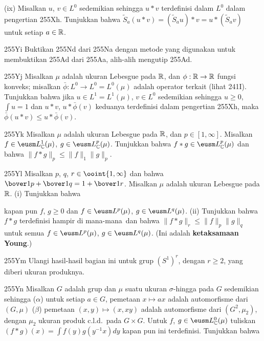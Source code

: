 {\quad (ix) Misalkan $u$, $v\in L^0$ sedemikian sehingga $u*v$ terdefinisi
dalam $L^0$ dalam pengertian 255Xh.   Tunjukkan bahwa
$\tilde S_a(u*v)=(\tilde S_au)*v=u*(\tilde S_av)$ untuk
setiap $a\in\Bbb R$.

\spheader 255Yi Buktikan 255Nd dari 255Na dengan metode yang digunakan untuk
membuktikan 255Ad dari 255Aa, alih-alih mengutip 255Ad.

\spheader 255Yj Misalkan $\mu$ adalah ukuran Lebesgue pada $\Bbb R$, dan
$\phi:\Bbb R\to\Bbb R$ fungsi konveks;  misalkan
$\bar\phi:L^0\to L^0=L^0(\mu)$ adalah operator terkait (lihat 241I).
Tunjukkan bahwa jika $u\in L^1=L^1(\mu)$, $v\in L^0$ sedemikian sehingga $u\ge 0$,
$\int u=1$ dan $u*v$, $u*\bar\phi(v)$ keduanya terdefinisi dalam pengertian
255Xh, maka $\bar\phi(u*v)\le u*\bar\phi(v)$.

\spheader 255Yk Misalkan $\mu$ adalah ukuran Lebesgue pada $\Bbb R$, dan
$p\in[1,\infty]$.   Misalkan $f\in\eusm L^1_{\Bbb C}(\mu)$,
$g\in\eusm L^p_{\Bbb C}(\mu)$.   Tunjukkan bahwa
$f*g\in\eusm L^p_{\Bbb C}(\mu)$ dan bahwa
$\|f*g\|_p\le\|f\|_1\|g\|_p$.   

\spheader 255Yl Misalkan $p$, $q$, $r\in\ooint{1,\infty}$ dan bahwa
$\bover1p+\bover1q=1+\bover1r$.   Misalkan $\mu$ adalah ukuran Lebesgue pada
$\Bbb R$.   (i) Tunjukkan bahwa


\noindent kapan pun $f$, $g\ge 0$ dan $f\in\eusm L^p(\mu)$,
$g\in\eusm L^q(\mu)$.      (ii)
Tunjukkan bahwa $f*g$ terdefinisi hampir di mana-mana\ dan bahwa
$\|f*g\|_r\le\|f\|_p\|g\|_q$ untuk semua $f\in\eusm L^p(\mu)$,
$g\in\eusm L^q(\mu)$.   
(Ini adalah {\bf ketaksamaan Young}.)

\spheader 255Ym Ulangi hasil-hasil bagian ini untuk grup
$(S^1)^r$, dengan $r\ge 2$, yang diberi ukuran produknya.

\spheader 255Yn Misalkan $G$ adalah grup dan $\mu$ suatu ukuran
$\sigma$-hingga pada $G$ sedemikian sehingga ($\alpha$) untuk setiap $a\in G$,
pemetaan $x\mapsto ax$ adalah automorfisme dari $(G,\mu)$ ($\beta$) pemetaan
$(x,y)\mapsto (x,xy)$ adalah automorfisme dari $(G^2,\mu_2)$, dengan $\mu_2$
ukuran produk c.l.d.\ pada $G\times G$.   Untuk $f$,
$g\in\eusm L^0_{\Bbb C}(\mu)$ tuliskan $(f*g)(x)=\int f(y)g(y^{-1}x)dy$
kapan pun ini terdefinisi.   Tunjukkan bahwa

}

